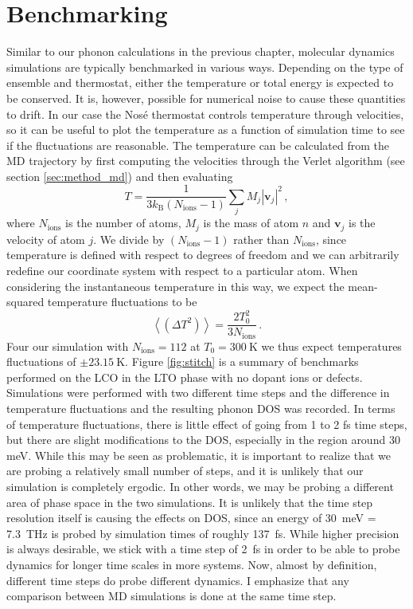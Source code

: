 \section{Benchmarking}
Similar to our phonon calculations in the previous chapter, molecular dynamics simulations are typically benchmarked in various ways. Depending on the type of ensemble and thermostat, either the temperature or total energy is expected to be conserved. It is, however, possible for numerical noise to cause these quantities to drift. In our case the Nos\'{e} thermostat controls temperature through velocities, so it can be useful to plot the temperature as a function of simulation time to see if the fluctuations are reasonable. The temperature can be calculated from the MD trajectory by first computing the velocities through the Verlet algorithm (see section \ref{sec:method_md}) and then evaluating
%
\[ T = \frac{1}{3 k_\text{B} (N_\text{ions}-1)} \sum_j M_j |\bm{v}_j|^2 \, , \]
%
where $N_\text{ions}$ is the number of atoms, $M_j$ is the mass of atom $n$ and $\bm{v}_j$ is the velocity of atom $j$. We divide by $(N_\text{ions} - 1)$ rather than $N_\text{ions}$, since temperature is defined with respect to degrees of freedom and we can arbitrarily redefine our coordinate system with respect to a particular atom. When considering the instantaneous temperature in this way, we expect the mean-squared temperature fluctuations to be \cite{Hickman2016}
%
\[ \left\langle \left( \Delta T^2 \right) \right\rangle = \frac{2T_0^2}{3N_\text{ions}} \, . \]
%
Four our simulation with $N_\text{ions} = 112$ at $T_0 = \SI{300}{\kelvin}$ we thus expect temperatures fluctuations of $\pm \SI{23.15}{\kelvin}$. Figure \ref{fig:stitch} is a summary of benchmarks performed on the LCO in the LTO phase with no dopant ions or defects. Simulations were performed with two different time steps and the difference in temperature fluctuations and the resulting phonon DOS was recorded. In terms of temperature fluctuations, there is little effect of going from 1 to 2 fs time steps, but there are slight modifications to the DOS, especially in the region around 30 meV. While this may be seen as problematic, it is important to realize that we are probing a relatively small number of steps, and it is unlikely that our simulation is completely ergodic. In other words, we may be probing a different area of phase space in the two simulations. It is unlikely that the time step resolution itself is causing the effects on DOS, since an energy of \SI{30}{\milli\eV} = \SI{7.3}{\tera\hertz} is probed by simulation times of roughly \SI{137}{\femto\second}. While higher precision is always desirable, we stick with a time step of \SI{2}{\femto\second} in order to be able to probe dynamics for longer time scales in more systems. Now, almost by definition, different time steps do probe different dynamics. I emphasize that any comparison between MD simulations is done at the same time step.

